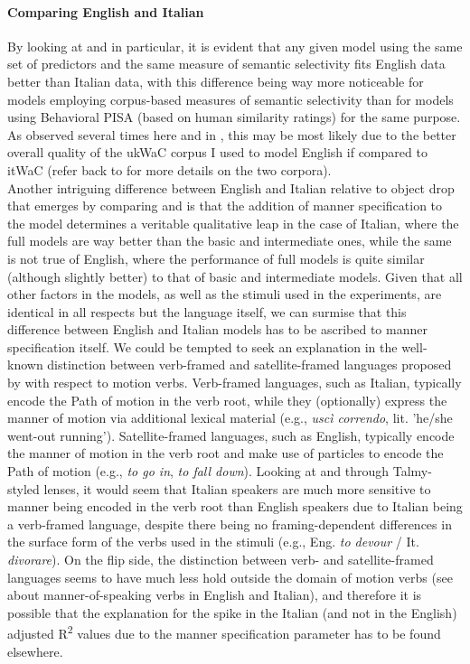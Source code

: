 \paragraph{Comparing English and Italian} By looking at  and  in particular, it is evident that any given model using the same set of predictors and the same measure of semantic selectivity fits English data better than Italian data, with this difference being way more noticeable for models employing corpus-based measures of semantic selectivity than for models using Behavioral PISA (based on human similarity ratings) for the same purpose. As observed several times here and in , this may be most likely due to the better overall quality of the ukWaC corpus I used to model English if compared to itWaC (refer back to  for more details on the two corpora).\\ %
Another intriguing difference between English and Italian relative to object drop that emerges by comparing  and  is that the addition of manner specification to the model determines a veritable qualitative leap in the case of Italian, where the full models are way better than the basic and intermediate ones, while the same is not true of English, where the performance of full models is quite similar (although slightly better) to that of basic and intermediate models. Given that all other factors in the models, as well as the stimuli used in the experiments, are identical in all respects but the language itself, we can surmise that this difference between English and Italian models has to be ascribed to manner specification itself. We could be tempted to seek an explanation in the well-known distinction between verb-framed and satellite-framed languages proposed by \textcite{talmy1991path, talmy2000toward} with respect to motion verbs. Verb-framed languages, such as Italian, typically encode the Path of motion in the verb root, while they (optionally) express the manner of motion via additional lexical material (e.g., \textit{uscì correndo}, lit. 'he/she went-out running'). Satellite-framed languages, such as English, typically encode the manner of motion in the verb root and make use of particles to encode the Path of motion (e.g., \textit{to go in}, \textit{to fall down}). Looking at  and  through Talmy-styled lenses, it would seem that Italian speakers are much more sensitive to manner being encoded in the verb root than English speakers due to Italian being a verb-framed language, despite there being no framing-dependent differences in the surface form of the verbs used in the stimuli (e.g., Eng. \textit{to devour} / It. \textit{divorare}). On the flip side, the distinction between verb- and satellite-framed languages seems to have much less hold outside the domain of motion verbs (see \textcite{mastrofini2013english} about manner-of-speaking verbs in English and Italian), and therefore it is possible that the explanation for the spike in the Italian (and not in the English) adjusted R\textsuperscript{2} values due to the manner specification parameter has to be found elsewhere.


